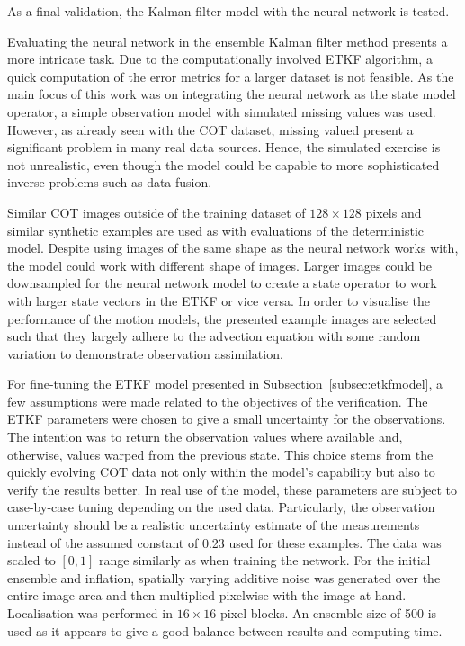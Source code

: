 As a final validation, the Kalman filter model with the neural network is tested.

Evaluating the neural network in the ensemble Kalman filter method presents a more intricate task.
Due to the computationally involved ETKF algorithm, a quick computation of the error metrics for a larger dataset is not feasible.
As the main focus of this work was on integrating the neural network as the state model operator, a simple observation model with simulated missing values was used.
However, as already seen with the COT dataset, missing valued present a significant problem in many real data sources.
Hence, the simulated exercise is not unrealistic, even though the model could be capable to more sophisticated inverse problems such as data fusion. 

Similar COT images outside of the training dataset of $128 \times 128$ pixels and similar synthetic examples are used as with evaluations of the deterministic model.
Despite using images of the same shape as the neural network works with, the model could work with different shape of images.
Larger images could be downsampled for the neural network model to create a state operator to work with larger state vectors in the ETKF or vice versa.
In order to visualise the performance of the motion models, the presented example images are selected such that they largely adhere to the advection equation with some random variation to demonstrate observation assimilation.

For fine-tuning the ETKF model presented in Subsection~\ref{subsec:etkfmodel}, a few assumptions were made related to the objectives of the verification.
The ETKF parameters were chosen to give a small uncertainty for the observations.
The intention was to return the observation values where available and, otherwise, values warped from the previous state.
This choice stems from the quickly evolving COT data not only within the model's capability but also to verify the results better.
In real use of the model, these parameters are subject to case-by-case tuning depending on the used data.
Particularly, the observation uncertainty should be a realistic uncertainty estimate of the measurements instead of the assumed constant of 0.23 used for these examples.
The data was scaled to $[0, 1]$ range similarly as when training the network.
For the initial ensemble and inflation, spatially varying additive noise was generated over the entire image area and then multiplied pixelwise with the image at hand.
Localisation was performed in $16 \times 16$ pixel blocks.
An ensemble size of 500 is used as it appears to give a good balance between results and computing time.

